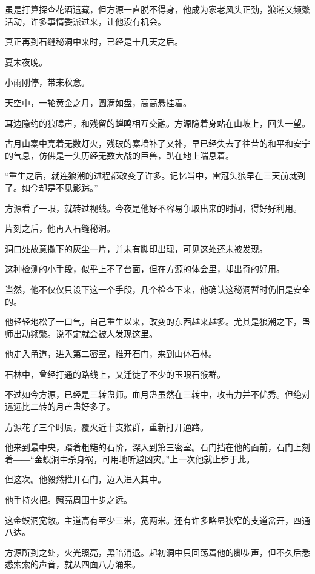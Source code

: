 
\begin{this_body}

虽是打算探查花酒遗藏，但方源一直脱不得身，他成为家老风头正劲，狼潮又频繁活动，许多事情委派过来，让他没有机会。

真正再到石缝秘洞中来时，已经是十几天之后。

夏末夜晚。

小雨刚停，带来秋意。

天空中，一轮黄金之月，圆满如盘，高高悬挂着。

耳边隐约的狼嗥声，和残留的蝉鸣相互交融。方源隐着身站在山坡上，回头一望。

古月山寨中亮着无数灯火，残破的寨墙补了又补，早已经失去了往昔的和平和安宁的气息，仿佛是一头历经无数大战的巨兽，趴在地上喘息着。

“重生之后，就连狼潮的进程都改变了许多。记忆当中，雷冠头狼早在三天前就到了。如今却是不见影踪。”

方源看了一眼，就转过视线。今夜是他好不容易争取出来的时间，得好好利用。

片刻之后，他再入石缝秘洞。

洞口处故意撒下的灰尘一片，并未有脚印出现，可见这处还未被发现。

这种检测的小手段，似乎上不了台面，但在方源的体会里，却出奇的好用。

当然，他不仅仅只设下这一个手段，几个检查下来，他确认这秘洞暂时仍旧是安全的。

他轻轻地松了一口气，自己重生以来，改变的东西越来越多。尤其是狼潮之下，蛊师出动频繁。说不定就会被人发现这里。

他走入甬道，进入第二密室，推开石门，来到山体石林。

石林中，曾经打通的路线上，又迁徙了不少的玉眼石猴群。

不过如今方源，已经是三转蛊师。血月蛊虽然在三转中，攻击力并不优秀。但绝对远远比二转的月芒蛊好多了。

方源花了三个时辰，覆灭近十支猴群，重新打开通路。

他来到最中央，踏着粗糙的石阶，深入到第三密室。石门挡在他的面前，石门上刻着――“金蜈洞中杀身祸，可用地听避凶灾。”上一次他就止步于此。

但这次。他毅然推开石门，迈入进入其中。

他手持火把。照亮周围十步之远。

这金蜈洞宽敞。主道高有至少三米，宽两米。还有许多略显狭窄的支道岔开，四通八达。

方源所到之处，火光照亮，黑暗消退。起初洞中只回荡着他的脚步声，但不久后悉悉索索的声音，就从四面八方涌来。


\end{this_body}
